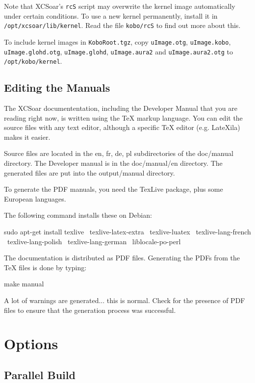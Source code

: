 Note that XCSoar's \texttt{rcS} script may overwrite the kernel image
automatically under certain conditions.  To use a new kernel
permanently, install it in \texttt{/opt/xcsoar/lib/kernel}.  Read the
file \texttt{kobo/rcS} to find out more about this.

To include kernel images in \texttt{KoboRoot.tgz}, copy
\texttt{uImage.otg}, \texttt{uImage.kobo}, \texttt{uImage.glohd.otg},
\texttt{uImage.glohd}, \texttt{uImage.aura2} and \texttt{uImage.aura2.otg} to
\texttt{/opt/kobo/kernel}.

\subsection{Editing the Manuals}

The XCSoar documententation, including the Developer Manual that you are 
reading right now, is written using the TeX markup language. You can edit
the source files with any text editor, although a specific TeX editor (e.g. LateXila) 
makes it easier. 

Source files are located in the en, fr, de, pl subdirectories of the doc/manual directory. 
The Developer manual is in the doc/manual/en directory. The generated files are put into
the output/manual directory.

To generate the PDF manuals, you need the TexLive package, plus some European languages.

The following command installs these on Debian:

\begin{verbatim*}
sudo apt-get install texlive \
  texlive-latex-extra \
  texlive-luatex \
  texlive-lang-french \
  texlive-lang-polish \
  texlive-lang-german \
  liblocale-po-perl
\end{verbatim*}

The documentation is distributed as PDF files. Generating the PDFs from the 
TeX files is done by typing:

\begin{verbatim*}
make manual
\end{verbatim*}

A lot of warnings are generated... this is normal. Check for the presence of PDF files 
to ensure that the generation process was successful.
\section{Options}

\subsection{Parallel Build}

